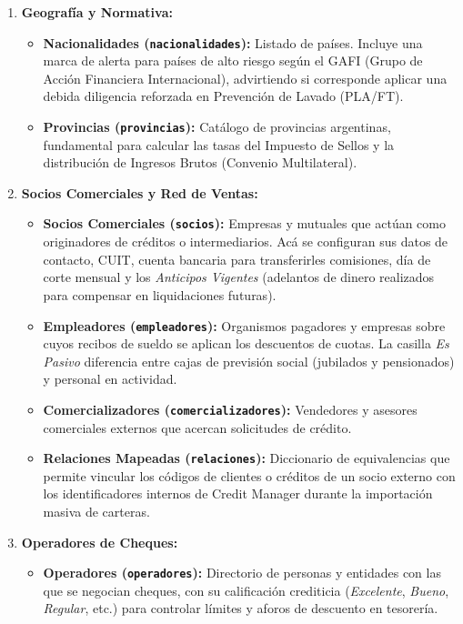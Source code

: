 \documentclass[12pt,a4paper]{article}
\renewcommand{\_}{\textunderscore\allowbreak}
\begin{document}
\begin{enumerate}
    \item \textbf{Geografía y Normativa:}
          \begin{itemize}
              \item \textbf{Nacionalidades (\texttt{nacionalidades}):} Listado de países. Incluye una marca de alerta para países de alto riesgo según el GAFI (Grupo de Acción Financiera Internacional), advirtiendo si corresponde aplicar una debida diligencia reforzada en Prevención de Lavado (PLA/FT).
              \item \textbf{Provincias (\texttt{provincias}):} Catálogo de provincias argentinas, fundamental para calcular las tasas del Impuesto de Sellos y la distribución de Ingresos Brutos (Convenio Multilateral).
          \end{itemize}

    \item \textbf{Socios Comerciales y Red de Ventas:}
          \begin{itemize}\raggedright
              \item \textbf{Socios Comerciales (\texttt{socios}):} Empresas y mutuales que actúan como originadores de créditos o intermediarios. Acá se configuran sus datos de contacto, CUIT, cuenta bancaria para transferirles comisiones, día de corte mensual y los \textit{Anticipos Vigentes} (adelantos de dinero realizados para compensar en liquidaciones futuras).
              \item \textbf{Empleadores (\texttt{empleadores}):} Organismos pagadores y empresas sobre cuyos recibos de sueldo se aplican los descuentos de cuotas. La casilla \textit{Es Pasivo} diferencia entre cajas de previsión social (jubilados y pensionados) y personal en actividad.
              \item \textbf{Comercializadores (\texttt{comercializadores}):} Vendedores y asesores comerciales externos que acercan solicitudes de crédito.
              \item \textbf{Relaciones Mapeadas (\texttt{relaciones}):} Diccionario de equivalencias que permite vincular los códigos de clientes o créditos de un socio externo con los identificadores internos de Credit Manager durante la importación masiva de carteras.
          \end{itemize}

    \item \textbf{Operadores de Cheques:}
          \begin{itemize}
              \item \textbf{Operadores (\texttt{operadores}):} Directorio de personas y entidades con las que se negocian cheques, con su calificación crediticia (\textit{Excelente}, \textit{Bueno}, \textit{Regular}, etc.) para controlar límites y aforos de descuento en tesorería.
          \end{itemize}


\end{enumerate}
\end{document}
